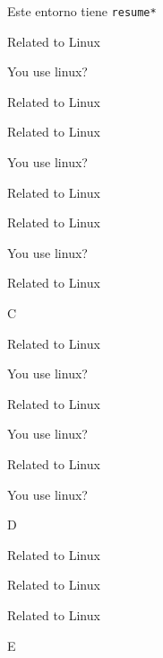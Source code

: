 \documentclass{article}
\begin{document}
Este entorno tiene \verb+resume*+

\begin{enumext}[resume*]
  \item Related to Linux
  \item You use linux? %
  \item Related to Linux
\end{enumext}

\stop

\begin{enumext}[series=B]
  \item Related to Linux
  \item You use linux? %
  \item Related to Linux
\end{enumext}

\begin{enumext}[resume=A]
  \item Related to Linux
  \item You use linux? %
  \item Related to Linux
\end{enumext}
\stop
C

\begin{enumext}[resume=A]
  \item Related to Linux
  \item You use linux? %
  \item Related to Linux
  \item You use linux? %
  \item Related to Linux
  \item You use linux? %
\end{enumext}

D

\begin{enumext}[label={\roman*.)}]
  \item Related to Linux
  \item Related to Linux
  \item Related to Linux
\end{enumext}

E
\end{document}
